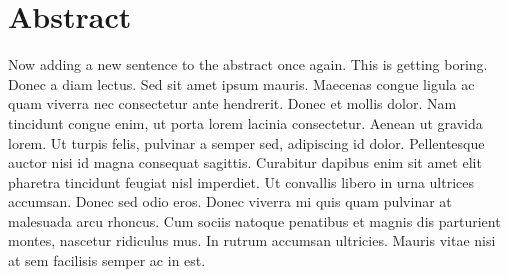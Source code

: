 
\section*{Abstract}

Now adding a new sentence to the abstract once again. This is getting boring. Donec a diam lectus. Sed sit amet ipsum
mauris. Maecenas congue ligula ac quam viverra nec consectetur ante hendrerit. Donec et mollis dolor. Nam tincidunt
congue enim, ut porta lorem lacinia consectetur. Aenean ut gravida lorem. Ut turpis felis, pulvinar a semper sed,
adipiscing id dolor. Pellentesque auctor nisi id magna consequat sagittis. Curabitur dapibus enim sit amet elit
pharetra tincidunt feugiat nisl imperdiet. Ut convallis libero in urna ultrices accumsan. Donec sed odio eros. Donec
viverra mi quis quam pulvinar at malesuada arcu rhoncus. Cum sociis natoque penatibus et magnis dis parturient montes,
nascetur ridiculus mus. In rutrum accumsan ultricies. Mauris vitae nisi at sem facilisis semper ac in est.

